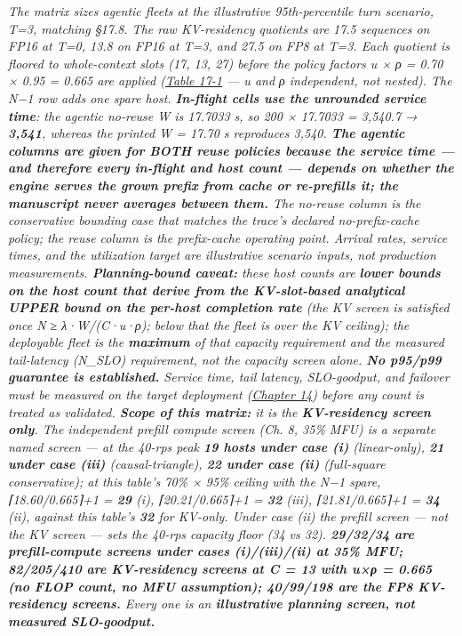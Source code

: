 \emph{The matrix sizes agentic fleets at the illustrative
95th-percentile turn scenario, T=3, matching §17.8. The raw KV-residency
quotients are 17.5 sequences on FP16 at T=0, 13.8 on FP16 at T=3, and
27.5 on FP8 at T=3. Each quotient is floored to whole-context slots (17,
13, 27) before the policy factors u × ρ = 0.70 × 0.95 = 0.665 are
applied (\hyperref[tab:17.1]{Table 17-1} --- u and ρ independent, not nested). The N−1 row
adds one spare host. \textbf{In-flight cells use the unrounded service
time}: the agentic no-reuse W is 17.7033 s, so 200 × 17.7033 = 3,540.7 →
\textbf{3,541}, whereas the printed W = 17.70 s reproduces 3,540.
\textbf{The agentic columns are given for BOTH reuse policies because
the service time --- and therefore every in-flight and host count ---
depends on whether the engine serves the grown prefix from cache or
re-prefills it; the manuscript never averages between them.} The
no-reuse column is the conservative bounding case that matches the
trace's declared no-prefix-cache policy; the reuse column is the
prefix-cache operating point. Arrival rates, service times, and the
utilization target are illustrative scenario inputs, not production
measurements. \textbf{Planning-bound caveat:} these host counts are
\textbf{lower bounds on the host count that derive from the
KV-slot-based analytical UPPER bound on the per-host completion rate}
(the KV screen is satisfied once N ≥ λ·W/(C·u·ρ); below that the fleet
is over the KV ceiling); the deployable fleet is the \textbf{maximum} of
that capacity requirement and the measured tail-latency (N\_SLO)
requirement, not the capacity screen alone. \textbf{No p95/p99 guarantee
is established.} Service time, tail latency, SLO-goodput, and failover
must be measured on the target deployment (\hyperref[chap:14]{Chapter 14}) before any count
is treated as validated. \textbf{Scope of this matrix:} it is the
\textbf{KV-residency screen only}. The independent prefill compute
screen (Ch. 8, 35\% MFU) is a separate named screen --- at the 40-rps
peak \textbf{19 hosts under case (i)} (linear-only), \textbf{21 under
case (iii)} (causal-triangle), \textbf{22 under case (ii)} (full-square
conservative); at this table's 70\% × 95\% ceiling with the N−1 spare,
⌈18.60/0.665⌉+1 = \textbf{29} (i), ⌈20.21/0.665⌉+1 = \textbf{32} (iii),
⌈21.81/0.665⌉+1 = \textbf{34} (ii), against this table's \textbf{32} for
KV-only. Under case (ii) the prefill screen --- not the KV screen ---
sets the 40-rps capacity floor (34 vs 32). \textbf{29/32/34 are
prefill-compute screens under cases (i)/(iii)/(ii) at 35\% MFU;
82/205/410 are KV-residency screens at C = 13 with u×ρ = 0.665 (no FLOP
count, no MFU assumption); 40/99/198 are the FP8 KV-residency screens.}
Every one is an \textbf{illustrative planning screen, not measured
SLO-goodput.}}
